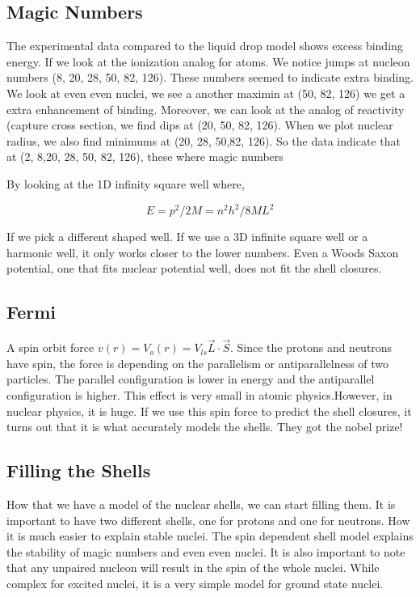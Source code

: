 \documentclass[english, 11pt]{article}
\begin{document}
\subsection{Magic Numbers}

The experimental data compared to the liquid drop model shows excess binding energy. If we look at the ionization analog for atoms. We notice jumps at nucleon numbers (8, 20, 28, 50, 82, 126). These numbers seemed to indicate extra binding. We look at even even nuclei, we see a another maximin at (50, 82, 126) we get a extra enhancement of binding. Moreover, we can look at the analog of reactivity (capture cross section, we find dips at (20, 50, 82, 126). When we plot nuclear radius, we also find minimums at (20, 28, 50,82, 126). So the data indicate that at (2, 8,20, 28, 50, 82, 126), these where magic numbers

By looking at the 1D infinity square well where,

\[E = p^2/2M = n^2h^2 / 8ML^2 \]

If we pick a different shaped well. If we use a 3D infinite square well or a harmonic well, it only works closer to the lower numbers. Even a Woods Saxon potential, one that fits nuclear potential well, does not fit the shell closures.

\subsection{Fermi}

A spin orbit force $v(r) = V_o(r) = V_{ls}\vec{L}\cdot\vec{S}$. Since the protons and neutrons have spin, the force is depending on the parallelism or antiparallelness of two particles. The parallel configuration is lower in energy and the antiparallel configuration is higher. This effect is very small in atomic physics.However, in nuclear physics, it is huge. If we use this spin force to predict the shell closures, it turns out that it is what accurately models the shells. They got the nobel prize!

\subsection{Filling the Shells}

How that we have a model of the nuclear shells, we can start filling them. It is important to have two different shells, one for protons and one for neutrons. How it is much easier to explain stable nuclei. The spin dependent shell model explains the stability of magic numbers and even even nuclei. It is also important to note that any unpaired nucleon will result in the spin of the whole nuclei. While complex for excited nuclei, it is a very simple model for ground state nuclei.
\end{document}
